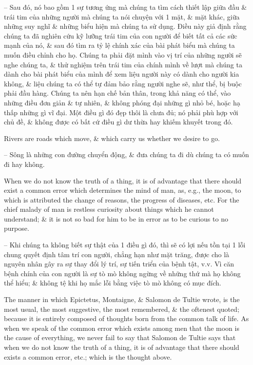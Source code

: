 \documentclass{article}
\begin{document}
\begin{enumerate}
\begin{itemize}
		-- Sau đó, nó bao gồm 1 sự tương ứng mà chúng ta tìm cách thiết lập giữa đầu \& trái tim của những người mà chúng ta nói chuyện với 1 mặt, \& mặt khác, giữa những suy nghĩ \& những biểu hiện mà chúng ta sử dụng. Điều này giả định rằng chúng ta đã nghiên cứu kỹ lưỡng trái tim của con người để biết tất cả các sức mạnh của nó, \& sau đó tìm ra tỷ lệ chính xác của bài phát biểu mà chúng ta muốn điều chỉnh cho họ. Chúng ta phải đặt mình vào vị trí của những người sẽ nghe chúng ta, \& thử nghiệm trên trái tim của chính mình về lượt mà chúng ta dành cho bài phát biểu của mình để xem liệu người này có dành cho người kia không, \& liệu chúng ta có thể tự đảm bảo rằng người nghe sẽ, như thể, bị buộc phải đầu hàng. Chúng ta nên hạn chế bản thân, trong khả năng có thể, vào những điều đơn giản \& tự nhiên, \& không phóng đại những gì nhỏ bé, hoặc hạ thấp những gì vĩ đại. Một điều gì đó đẹp thôi là chưa đủ; nó phải phù hợp với chủ đề, \& không được có bất cứ điều gì dư thừa hay khiếm khuyết trong đó.
		
		 Rivers are roads which move, \& which carry us whether we desire to go.
		
		-- Sông là những con đường chuyển động, \& đưa chúng ta đi dù chúng ta có muốn đi hay không.
		
		 When we do not know the truth of a thing, it is of advantage that there should exist a common error which determines the mind of man, as, e.g., the moon, to which is attributed the change of reasons, the progress of diseases, etc. For the chief malady of man is restless curiosity about things which he cannot understand; \& it is not so bad for him to be in error as to be curious to no purpose.
		
		-- Khi chúng ta không biết sự thật của 1 điều gì đó, thì sẽ có lợi nếu tồn tại 1 lỗi chung quyết định tâm trí con người, chẳng hạn như mặt trăng, được cho là nguyên nhân gây ra sự thay đổi lý trí, sự tiến triển của bệnh tật, v.v. Vì căn bệnh chính của con người là sự tò mò không ngừng về những thứ mà họ không thể hiểu; \& không tệ khi họ mắc lỗi bằng việc tò mò không có mục đích.
		
		The manner in which {\sc Epictetus, Montaigne, \& Salomon de Tultie} wrote, is the most usual, the most suggestive, the most remembered, \& the oftenest quoted; because it is entirely composed of thoughts born from the common talk of life. As when we speak of the common error which exists among men that the moon is the cause of everything, we never fail to say that {\sc Salomon de Tultie} says that when we do not know the truth of a thing, it is of advantage that there should exists a common error, etc.; which is the thought above.
		

\end{itemize}
\end{enumerate}
\end{document}
